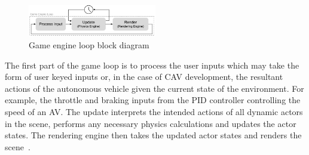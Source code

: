 \begin{figure}[h]
\centering
\includegraphics[width=0.5\textwidth]{Other/Figures/GameEngineLoop.pdf}
\caption{Game engine loop block diagram~\cite{GameProgPatternsBook}}
\label{GameEngineLoopDiagram}
\end{figure}
The first part of the game loop is to process the user inputs which may take the form of user keyed inputs or, in the case of CAV development, the resultant actions of the autonomous vehicle given the current state of the environment. For example, the throttle and braking inputs from the PID controller controlling the speed of an AV. %
%
The update interprets the intended actions of all dynamic actors in the scene, performs any necessary physics calculations and updates the actor states. %
%
The rendering engine then takes the updated actor states and renders the scene~\cite{GameProgPatternsBook}. %

